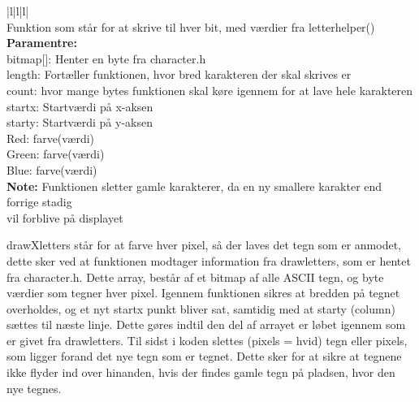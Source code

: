 \begin{center}
\begin{tabular}{ |l|l|l| }
\hline
{} \\
\hline
Funktion som står for at skrive til hver bit, med værdier fra letterhelper()\\
\hline
\textbf{Paramentre:}  \\bitmap[]: Henter en byte fra character.h\\ length: Fortæller funktionen, hvor bred karakteren der skal skrives er\\ count: hvor mange bytes funktionen skal køre igennem for at lave hele karakteren\\ startx: Startværdi på x-aksen \\starty: Startværdi på y-aksen\\ Red: farve(værdi)\\ Green: farve(værdi) \\ Blue: farve(værdi)\\
\textbf{Note:} Funktionen sletter gamle karakterer, da en ny smallere karakter end forrige stadig\\ vil forblive på displayet\\

\hline
\end{tabular}
\end{center}  

drawXletters står for at farve hver pixel, så der laves det tegn som er anmodet, dette sker ved at funktionen modtager information fra drawletters, som er hentet fra character.h. Dette array, består af et bitmap af alle ASCII tegn, og byte værdier som tegner hver pixel. Igennem funktionen sikres at bredden på tegnet overholdes, og et nyt startx punkt bliver sat, samtidig med at starty (column) sættes til næste linje. Dette gøres indtil den del af arrayet er løbet igennem som er givet fra drawletters. Til sidst i koden slettes (pixels = hvid) tegn eller pixels, som ligger forand det nye tegn som er tegnet. Dette sker for at sikre at tegnene ikke flyder ind over hinanden, hvis der findes gamle tegn på pladsen, hvor den nye tegnes. 


